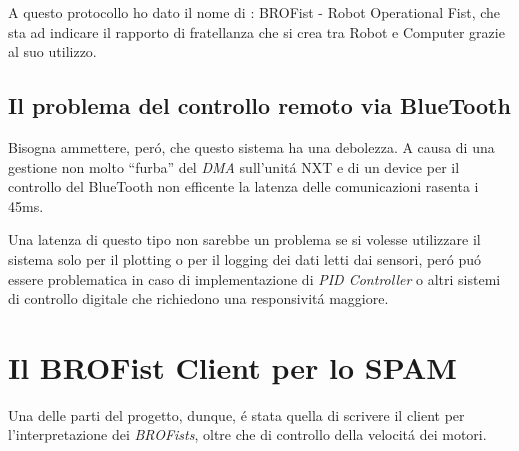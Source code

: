 A questo protocollo ho dato il nome di \BROFist{}: BROFist - Robot
Operational Fist, che sta ad indicare il rapporto di fratellanza che si
crea tra Robot e Computer grazie al suo utilizzo.

\subsection{Il problema del controllo remoto via BlueTooth}
Bisogna ammettere, per\'o, che questo sistema ha una debolezza. A causa di
una gestione non molto ``furba'' del \emph{DMA} sull'unit\'a NXT e di un
device per il controllo del BlueTooth non efficente la latenza delle
comunicazioni rasenta i 45ms.

Una latenza di questo tipo non sarebbe un problema se si volesse utilizzare
il sistema solo per il plotting o per il logging dei dati letti dai
sensori, per\'o pu\'o essere problematica in caso di implementazione di
\emph{PID Controller} o altri sistemi di controllo digitale che richiedono
una responsivit\'a maggiore.

\section{Il BROFist Client per lo SPAM}\label{sec:BROClient}
Una delle parti del progetto, dunque, \'e stata quella di scrivere il
client per l'interpretazione dei \emph{BROFists}, oltre che di controllo
della velocit\'a dei motori.

